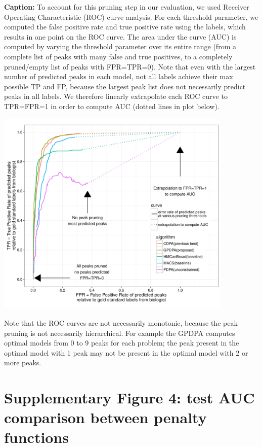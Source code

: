 \documentclass{article}
\begin{document}
\textbf{Caption:}
To account for this pruning step in our evaluation, we used Receiver
Operating Characteristic (ROC) curve analysis. For each threshold
parameter, we computed the false positive rate and true positive rate
using the labels, which results in one point on the ROC curve. The
area under the curve (AUC) is computed by varying the threshold
parameter over its entire range (from a complete list of peaks with
many false and true positives, to a completely pruned/empty list of
peaks with FPR=TPR=0). Note that even with the largest number of
predicted peaks in each model, not all labels achieve their max
possible TP and FP, because the largest peak list does not necessarily
predict peaks in all labels. We therefore linearly extrapolate each
ROC curve to TPR=FPR=1 in order to compute AUC (dotted lines in plot
below). 

\begin{center}
  \includegraphics[width=0.85\textwidth]{figure-test-error-dots-ROC-supp.pdf}
\end{center}

Note that the ROC curves are not necessarily monotonic, because the
peak pruning is not necessarily hierarchical. For example the GPDPA
computes optimal models from 0 to 9 peaks for each problem; the peak
present in the optimal model with 1 peak may not be present in the
optimal model with 2 or more peaks.

\section*{Supplementary Figure 4: test AUC comparison between penalty functions}
\end{document}
